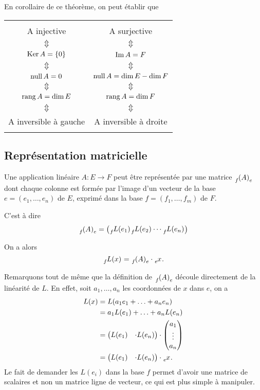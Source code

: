 En corollaire de ce théorème, on peut établir que
\begin{center}
  \begin{tabular}{|c c|}
    \hline
    &\\
    A injective & A surjective\\
    $\Updownarrow$ & $\Updownarrow$\\
    $\operatorname{Ker} A = \{0\}$ & $\operatorname{Im} A = F$\\
    $\Updownarrow$ & $\Updownarrow$\\
    $\operatorname{null} A = 0$ & $\operatorname{null} A = \dim E - \dim F$\\
    $\Updownarrow$ & $\Updownarrow$\\
    $\operatorname{rang} A = \dim E$ & $\operatorname{rang} A = \dim F$\\
    $\Updownarrow$ & $\Updownarrow$\\
    A inversible à gauche&A inversible à droite\\
    &\\
    \hline
  \end{tabular}
\end{center}

\subsection{Représentation matricielle}
Une application linéaire $A : E \rightarrow F$ peut être représentée par
une matrice $\tensor*[_f]{(A)}{_e}$ dont chaque colonne
est formée par l'image d'un vecteur
de la base $e = (e_1, \ldots, e_n)$ de $E$,
exprimé dans la base $f = (f_1, \ldots, f_m)$ de $F$.

C'est à dire
\[ \tensor*[_f]{(A)}{_e} =
\begin{pmatrix} \tensor*[_f]{L(e_1)}{} \tensor*[_f]{L(e_2)}{}
\cdots \tensor*[_f]{L(e_n)}{} \end{pmatrix} \]

On a alors
\[ \tensor*[_f]{L(x)}{} = \tensor*[_f]{(A)}{_e} \cdot \tensor*[_e]{x}{}. \]

Remarquons tout de même que la définition de $\tensor*[_f]{(A)}{_e}$
découle directement de la linéarité de $L$.
En effet,
soit $a_1, \ldots, a_n$ les coordonnées de $x$ dans $e$, on a
\begin{align*}
  L(x) & = L(a_1 e_1 + \ldots + a_n e_n)\\
  & =
  a_1L(e_1) + \ldots + a_nL(e_n)\\
  & =
  \begin{pmatrix}
    L(e_1) & \cdot L(e_n)
  \end{pmatrix}
  \cdot
  \begin{pmatrix}
    a_1\\
    \vdots\\
    a_n
  \end{pmatrix}\\
  & =
  \begin{pmatrix}
    L(e_1) & \cdot L(e_n)
  \end{pmatrix}
  \cdot
  \tensor*[_e]{x}{}.
\end{align*}
Le fait de demander les $L(e_i)$ dans la base $f$ permet d'avoir
une matrice de scalaires et non un matrice ligne de vecteur,
ce qui est plus simple à manipuler.

